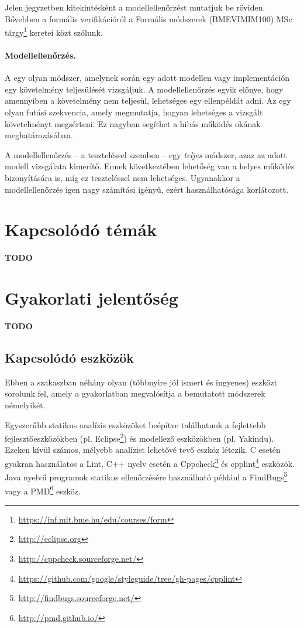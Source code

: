 Jelen jegyzetben kitekintésként a modellellenőrzést mutatjuk be röviden. Bővebben a formális verifikációról a Formális módszerek (BMEVIMIM100) MSc tárgy\footnote{\url{https://inf.mit.bme.hu/edu/courses/form}} keretei közt szólunk.

\paragraph{Modellellenőrzés.}
A  egy olyan módszer, amelynek során egy adott modellen vagy implementáción egy követelmény teljesülését vizsgáljuk. A modellellenőrzés egyik előnye, hogy amennyiben a követelmény nem teljesül, lehetséges egy ellenpéldát adni. Az  egy olyan futási szekvencia, amely megmutatja, hogyan lehetséges a vizsgált követelményt megsérteni. Ez nagyban segíthet a hibás működés okának meghatározásában.

A modellellenőrzés -- a teszteléssel szemben -- egy \emph{teljes} módszer, azaz az adott modell vizsgálata kimerítő. Ennek következtében lehetőség van a helyes működés bizonyítására is, míg ez teszteléssel nem lehetséges. Ugyanakkor a modellellenőrzés igen nagy számítási igényű, ezért használhatósága korlátozott.



\section{Kapcsolódó témák}
\textbf{TODO}

\section{Gyakorlati jelentőség}
\textbf{TODO}

\subsection{Kapcsolódó eszközök}
Ebben a szakaszban néhány olyan (többnyire jól ismert és ingyenes) eszközt sorolunk fel, amely a gyakorlatban megvalósítja a bemutatott módszerek némelyikét.

Egyszerűbb statikus analízis eszközöket beépítve találhatunk a fejlettebb fejlesztőeszközökben (pl. Eclipse\footnote{\url{http://eclipse.org}}) és modellező eszközökben (pl. Yakindu). Ezeken kívül számos, mélyebb analízist lehetővé tevő eszköz létezik. C esetén gyakran használatos a Lint, C++ nyelv esetén a Cppcheck\footnote{\url{http://cppcheck.sourceforge.net/}} és cpplint\footnote{\url{https://github.com/google/styleguide/tree/gh-pages/cpplint}} eszközök. Java nyelvű programok statikus ellenőrzésére használható például a FindBugs\footnote{\url{http://findbugs.sourceforge.net/}} vagy a PMD\footnote{\url{http://pmd.github.io/}} eszköz.

